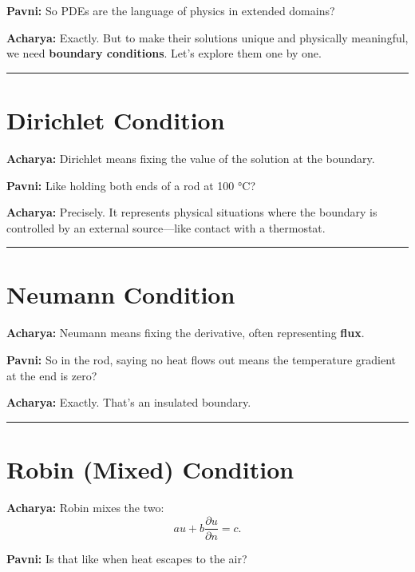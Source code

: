 \documentclass[
  letterpaper,
]{book}
\begin{document}
\textbf{Pavni:} So PDEs are the language of physics in extended domains?

\textbf{Acharya:} Exactly. But to make their solutions unique and
physically meaningful, we need \textbf{boundary conditions}. Let's
explore them one by one.

\begin{center}\rule{0.5\linewidth}{0.5pt}\end{center}

\section{Dirichlet Condition}\label{dirichlet-condition}

\textbf{Acharya:} Dirichlet means fixing the value of the solution at
the boundary.

\textbf{Pavni:} Like holding both ends of a rod at 100 °C?

\textbf{Acharya:} Precisely. It represents physical situations where the
boundary is controlled by an external source---like contact with a
thermostat.

\begin{center}\rule{0.5\linewidth}{0.5pt}\end{center}

\section{Neumann Condition}\label{neumann-condition}

\textbf{Acharya:} Neumann means fixing the derivative, often
representing \textbf{flux}.

\textbf{Pavni:} So in the rod, saying no heat flows out means the
temperature gradient at the end is zero?

\textbf{Acharya:} Exactly. That's an insulated boundary.

\begin{center}\rule{0.5\linewidth}{0.5pt}\end{center}

\section{Robin (Mixed) Condition}\label{robin-mixed-condition}

\textbf{Acharya:} Robin mixes the two:\\
\[
a u + b \frac{\partial u}{\partial n} = c.
\]

\textbf{Pavni:} Is that like when heat escapes to the air?
\end{document}
